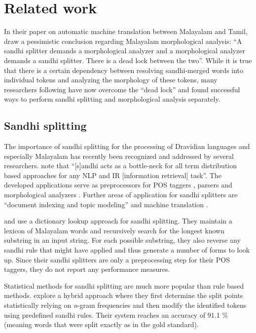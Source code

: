 \documentclass[a4paper]{article}
\begin{document}
\section{Related work}\label{sec:relatedwork}

In their \citeyear{jayan2011translation} paper on automatic machine translation between Malayalam and Tamil, \citeauthor{jayan2011translation} draw a pessimistic conclusion regarding Malayalam morphological analysis: ``A sandhi splitter demands a morphological analyzer and a morphological analyzer demands a sandhi splitter. There is a dead lock between the two''. While it is true that there is a certain dependency between resolving sandhi-merged words into individual tokens and analyzing the morphology of these tokens, many researchers following \textcite{jayan2011translation} have now overcome the ``dead lock'' and found successful ways to perform sandhi splitting and morphological analysis separately.

\subsection{Sandhi splitting}

The importance of sandhi splitting for the processing of Dravidian languages and especially Malayalam has recently been recognized and addressed by several researchers. \textcite{devadath2014sandhi} note that ``[s]andhi acts as a bottle-neck for all term distribution based approaches for any NLP and IR [information retrieval] task''. The developed applications serve as preprocessors for POS taggers \parencite{manju2009pos,bindu2011pos}, parsers \parencite{devadath2016parser} and morphological analyzers \parencite{sebastian2018morph}. Further areas of application for sandhi splitters are ``document indexing and topic modeling'' \parencite{nisha2016sandhi} and machine translation \parencite{jayan2011translation}.

\textcite{manju2009pos} and \textcite{bindu2011pos} use a dictionary lookup approach for sandhi splitting. They maintain a lexicon of Malayalam words and recursively search for the longest known substring in an input string. For each possible substring, they also reverse any sandhi rule that might have applied and thus generate a number of forms to look up. Since their sandhi splitters are only a preprocessing step for their POS taggers, they do not report any performance measures.

Statistical methods for sandhi splitting are much more popular than rule based methods. \textcite{devadath2014sandhi} explore a hybrid approach where they first determine the split points statistically relying on \textit{n}-gram frequencies and then modify the identified tokens using predefined sandhi rules. Their system reaches an accuracy of 91.1 \% (meaning words that were split exactly as in the gold standard).
\end{document}
